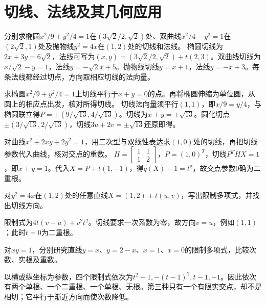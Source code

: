 \par\addvspace{12pt}

\section{切线、法线及其几何应用}

分别求椭圆\(x^2/9+y^2/4=1\)在\((3\sqrt2/2,\sqrt2)\)处、双曲线\(x^2/4-y^2=1\)在\((2\sqrt2,1)\)处及抛物线\(y^2=4x\)在\((1,2)\)处的切线和法线。
\solutionanswer
椭圆切线为\(2x+3y=6\sqrt2\)，法线可写为\((x,y)=(3\sqrt2/2,\sqrt2)+t(2,3)\)。双曲线切线为\(x/\sqrt2-y=1\)，法线\(y=-\sqrt2x+5\)。抛物线切线\(y=x+1\)，法线\(y=-x+3\)。每条法线都经过切点，方向取相应切线的法向量。


求椭圆\(x^2/9+y^2/4=1\)上切线平行于\(x+y=0\)的点。再将椭圆伸缩为单位圆，从圆上的相应点出发，核对所得切线。
\solutionanswer
切线法向量须平行\((1,1)\)，即\(x/9=y/4\)，与椭圆联立得\(P=\pm(9/\sqrt{13},4/\sqrt{13})\)。切线为\(x+y=\pm\sqrt{13}\)。圆化切点\(\pm(3/\sqrt{13},2/\sqrt{13})\)，切线\(3u+2v=\pm\sqrt{13}\)还原即得。


对曲线\(x^2+2xy+2y^2=1\)，用二次型与双线性表达求\((1,0)\)处的切线，再把切线参数代入曲线，核对交点的重数。
\solutionanswer
\(H=\begin{bmatrix}1&1\\1&2\end{bmatrix}\)，\(P=(1,0)^T\)，切线\(P^THX=1\)，即\(x+y=1\)。代入\(X=P+t(1,-1)\)，得\(q(X)-1=t^2\)，故交点参数\(0\)确为二重根。


对\(y^2=4x\)在\((1,2)\)处的任意直线\(X=(1,2)+t(u,v)\)，写出限制多项式，并找出切线方向。
\par
\solutionanswer
限制式为\(4t(v-u)+v^2t^2\)。切线要求一次系数为零，故方向\(v=u\)，例如\((1,1)\)；此时\(t=0\)为二重根。


对\(xy=1\)，分别研究直线\(y=x\)、\(y=2-x\)、\(x=1\)、\(x=0\)的限制多项式，比较次数、实根及重数。
\par
\solutionanswer
以横或纵坐标为参数，四个限制式依次为\(t^2-1,-(t-1)^2,t-1,-1\)。因此依次有两个单根、一个二重根、一个单根、无根。第三种只有一个有限实交点，却不是相切；它平行于渐近方向而使次数降低。


